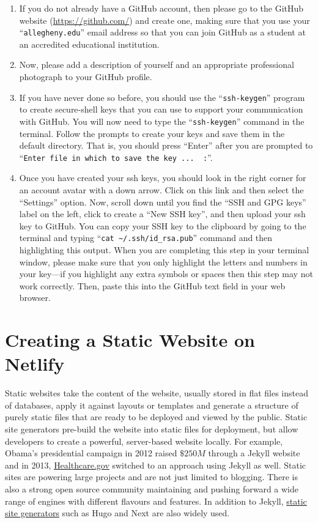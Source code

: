 \documentclass[11pt]{article}
\newcommand{\command}[1]{``\lstinline{#1}''}
\begin{document}
\begin{enumerate}
  \item If you do not already have a GitHub account, then please go to the GitHub website (\url{https://github.com/}) and create one, making sure
    that you use your \command{allegheny.edu} email address so that you can join GitHub as a student at an accredited
    educational institution. 
   \item Now, please add a description of yourself and an appropriate professional photograph to your GitHub profile. 
  \item If you have never done so before, you should use the \command{ssh-keygen} program to create secure-shell keys that
    you can use to support your communication with GitHub. You will now need to type the \command{ssh-keygen} command in the terminal. Follow
    the prompts to create your keys and save them in the default directory. That is, you should press ``Enter'' after
    you are prompted to \command{Enter file in which to save the key ...  :}.

  \item Once you have created your ssh keys, you should look in the right corner for
    an account avatar with a down arrow. Click on this link and then select the ``Settings'' option. Now, scroll down
    until you find the ``SSH and GPG keys'' label on the left, click to create a ``New SSH key'', and then upload your
    ssh key to GitHub. You can copy your SSH key to the clipboard by going to the terminal and typing ``{\tt cat
    \textasciitilde{}/.ssh/id\_rsa.pub}'' command and then highlighting this output. When you are completing this step
    in your terminal window, please make sure that you only highlight the letters and numbers in your key---if you
    highlight any extra symbols or spaces then this step may not work correctly. Then, paste this into the GitHub text
    field in your web browser.
    
    \end{enumerate}

\vspace{-0.05in}
\section*{Creating a Static Website on Netlify}

Static websites  take the content of the website, usually stored in flat files instead of databases, apply it against layouts or templates and generate a structure of purely static files that are ready to be deployed and viewed by the public. Static site generators pre-build the website into static files for deployment, but allow developers to create a powerful, server-based website locally. For example, Obama's presidential campaign in 2012 raised $\$250M$ through a Jekyll website and in 2013, \url{Healthcare.gov} switched to an approach using Jekyll as well. Static sites are powering large projects and are not just limited to blogging. There is also a strong open source community maintaining and pushing forward a wide range of engines with different flavours and features. In addition to Jekyll, \href{https://www.staticgen.com/}{static site generators} such as  Hugo and Next are also widely used.
\end{document}

